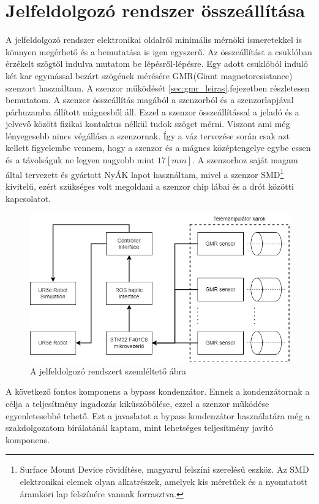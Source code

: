 \section{Jelfeldolgozó rendszer összeállítása}

A jelfeldolgozó rendszer elektronikai oldalról minimális mérnöki ismeretekkel is könnyen megérhető és a bemutatása is igen egyszerű. Az összeállítást a csuklóban érzékelt szögtől indulva mutatom be lépésről-lépésre. Egy adott csuklóból induló két kar egymással bezárt szögének mérésére GMR(Giant magnetoresistance) szenzort használtam. A szenzor működését \ref{sec:gmr_leiras}.fejezetben részletesen bemutatom. A szenzor összeállítás magából a szenzorból és a szenzorlapjával párhuzamba állított mágnesből áll. Ezzel a szenzor összeállítással a jeladó és a jelvevő között fizikai kontaktus nélkül tudok szöget mérni. Viszont ami még lényegesebb nincs végállása a szenzornak. Így a váz tervezése során csak azt kellett figyelembe vennem, hogy a szenzor és a mágnes középtengelye egybe essen és a távolságuk ne legyen nagyobb mint $17[mm]$. A szenzorhoz saját magam által tervezett és gyártott NyÁK lapot használtam, mivel a szenzor SMD\footnote{ Surface Mount Device rövidítése, magyarul felszíni szerelésű eszköz. Az SMD elektronikai elemek olyan alkatrészek, amelyek kis méretűek és a nyomtatott áramköri lap felszínére vannak forrasztva.} kivitelű, ezért szükséges volt megoldani a szenzor chip lábai és a drót közötti kapcsolatot.

\begin{figure}[!ht]
\centering
\includegraphics[width=125mm, keepaspectratio]{figures/Diagrammok/Telemanipulator_teljesrendszer}
\caption{A jelfeldolgozó rendszert szemléltető ábra}
\label{fig:Telemanipulator_teljesrendszer}
\end{figure}

A következő fontos komponens a bypass kondenzátor. Ennek a kondenzátornak a célja a teljesítmény ingadozás kiküszöbölése, ezzel a szenzor működése egyenletesebbé tehető. Ezt a javaslatot a bypass kondenzátor használatára még a szakdolgozatom bírálatánál kaptam, mint lehetséges teljesítmény javító komponens.

